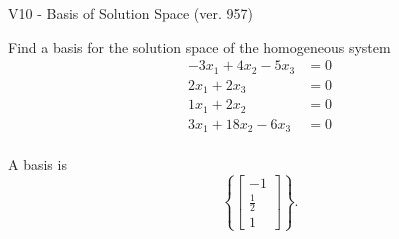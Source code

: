 \begin{exercise}
  \begin{exerciseTitle}V10 - Basis of Solution Space (ver. 957)\end{exerciseTitle}
  \begin{exerciseStatement}
    Find a basis for the solution space of the homogeneous system 
\begin{align*}
 -3 x_ 1 + 4 x_ 2 -5 x_ 3 &= 0  \\ 
  2 x_ 1 + 2 x_ 3 &= 0  \\ 
  1 x_ 1 + 2 x_ 2 &= 0  \\ 
  3 x_ 1 + 18 x_ 2 -6 x_ 3 &= 0  \\ 
 \end{align*}


 
  \end{exerciseStatement}

  \begin{exerciseAnswer}
   A basis is   
\[\left\{\left[\begin{array}{c}
-1 \\
\frac{1}{2} \\
1
\end{array}\right]\right\}.\]

  


  \end{exerciseAnswer}
\end{exercise}